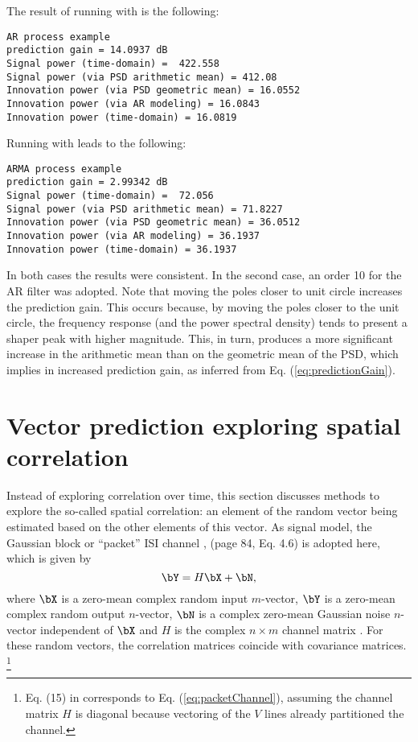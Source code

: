 %


The result of running  with  is the following:
\begin{verbatim}
AR process example
prediction gain = 14.0937 dB 
Signal power (time-domain) =  422.558 
Signal power (via PSD arithmetic mean) = 412.08 
Innovation power (via PSD geometric mean) = 16.0552 
Innovation power (via AR modeling) = 16.0843 
Innovation power (time-domain) = 16.0819 
\end{verbatim}

Running  with  leads to the following:
\begin{verbatim}
ARMA process example
prediction gain = 2.99342 dB 
Signal power (time-domain) =  72.056 
Signal power (via PSD arithmetic mean) = 71.8227 
Innovation power (via PSD geometric mean) = 36.0512 
Innovation power (via AR modeling) = 36.1937 
Innovation power (time-domain) = 36.1937 
\end{verbatim}

In both cases the results were consistent. In the second case, an order 10 for the AR filter was adopted. Note that moving the poles closer to unit circle increases the prediction gain. This occurs because, by moving the poles closer to the unit circle, the frequency response (and the power spectral density) tends to present a shaper peak with higher magnitude. This, in turn, produces a more significant increase in the arithmetic mean than on the geometric mean of the PSD, which implies in increased prediction gain, as inferred from Eq. (\ref{eq:predictionGain}).

\section{Vector prediction exploring spatial correlation}

Instead of exploring correlation over time, this section discusses methods to explore the so-called spatial correlation: an element of the random vector being estimated based on the other elements of this vector. As signal model, the Gaussian block or ``packet'' ISI channel \cite{Cioffi97}, (page 84, Eq. 4.6) is adopted here, which is given by
\begin{equation}
\bY = H \bX + \bN,
\label{eq:packetChannel}
\end{equation}
where $\bX$ is a zero-mean complex random input $m$-vector, $\bY$ is a zero-mean complex random output $n$-vector, $\bN$ is a complex zero-mean Gaussian noise $n$-vector independent of $\bX$ and $H$ is the complex $n \times m$ channel matrix \cite{Cioffi97}. For these random vectors, the correlation matrices coincide with covariance matrices. \footnote{Eq. (15) in \cite{Ginis06} corresponds to Eq. (\ref{eq:packetChannel}), assuming the channel matrix $H$ is diagonal because vectoring of the $V$ lines already partitioned the channel.}

